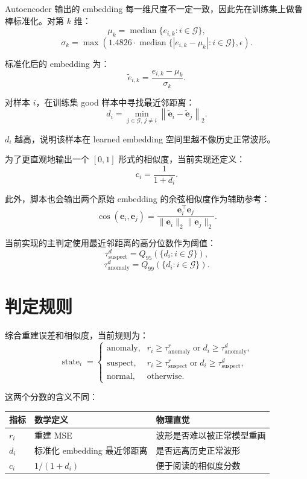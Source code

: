 \documentclass[UTF8,fontset=fandol]{ctexart}
\begin{document}
Autoencoder 输出的 embedding 每一维尺度不一定一致，因此先在训练集上做鲁棒标准化。对第 $k$ 维：
\[
  \mu_k = \operatorname{median}\{e_{i,k}: i\in\mathcal{G}\},
\]
\[
  \sigma_k
  =
  \max\left(
    1.4826\cdot
    \operatorname{median}\{|e_{i,k}-\mu_k|: i\in\mathcal{G}\},
    \epsilon
  \right).
\]

标准化后的 embedding 为：
\[
  \tilde{e}_{i,k}
  =
  \frac{e_{i,k}-\mu_k}{\sigma_k}.
\]

对样本 $i$，在训练集 good 样本中寻找最近邻距离：
\[
  d_i
  =
  \min_{j \in \mathcal{G},\, j \ne i}
  \left\|
    \tilde{\bm{e}}_i-\tilde{\bm{e}}_j
  \right\|_2.
\]

$d_i$ 越高，说明该样本在 learned embedding 空间里越不像历史正常波形。

为了更直观地输出一个 $[0,1]$ 形式的相似度，当前实现还定义：
\[
  c_i = \frac{1}{1+d_i}.
\]

此外，脚本也会输出两个原始 embedding 的余弦相似度作为辅助参考：
\[
  \operatorname{cos}(\bm{e}_i,\bm{e}_j)
  =
  \frac{
    \bm{e}_i^\top \bm{e}_j
  }{
    \|\bm{e}_i\|_2 \|\bm{e}_j\|_2
  }.
\]

当前实现的主判定使用最近邻距离的高分位数作为阈值：
\[
  \tau^{d}_{\text{suspect}} = Q_{95}\left(\{d_i:i\in\mathcal{G}\}\right),
\]
\[
  \tau^{d}_{\text{anomaly}} = Q_{99}\left(\{d_i:i\in\mathcal{G}\}\right).
\]

\section{判定规则}

综合重建误差和相似度，当前规则为：
\[
  \operatorname{state}_i =
  \begin{cases}
    \text{anomaly},
    &
    r_i \ge \tau^{r}_{\text{anomaly}}
    \;\text{or}\;
    d_i \ge \tau^{d}_{\text{anomaly}},
    \\[6pt]
    \text{suspect},
    &
    r_i \ge \tau^{r}_{\text{suspect}}
    \;\text{or}\;
    d_i \ge \tau^{d}_{\text{suspect}},
    \\[6pt]
    \text{normal},
    &
    \text{otherwise}.
  \end{cases}
\]

这两个分数的含义不同：

\begin{center}
\begin{tabular}{lll}
\toprule
指标 & 数学定义 & 物理直觉 \\
\midrule
$r_i$ & 重建 MSE & 波形是否难以被正常模型重画 \\
$d_i$ & 标准化 embedding 最近邻距离 & 是否远离历史正常波形 \\
$c_i$ & $1/(1+d_i)$ & 便于阅读的相似度分数 \\
\bottomrule
\end{tabular}
\end{center}
\end{document}
